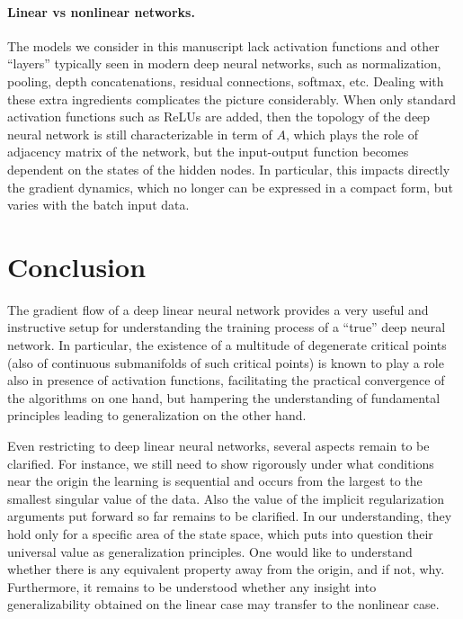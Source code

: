 \documentclass{article}
\newcommand{\1}{\mathds{1}}
\begin{document}
\paragraph{Linear vs nonlinear networks.}
The models we consider in this manuscript lack activation functions and other ``layers'' typically seen in modern deep neural networks, such as normalization, pooling, depth concatenations, residual connections, softmax, etc. 
Dealing with these extra ingredients complicates the picture considerably. 
When only standard activation functions such as ReLUs are added, then the topology of the deep neural network is still characterizable in term of $A$, which plays the role of adjacency matrix of the network, but the input-output function becomes dependent on the states of the hidden nodes. In particular, this impacts directly the gradient dynamics, which no longer can be expressed in a compact form, but varies with the batch input data.


\section{Conclusion}
\label{sec:conclusion}
The gradient flow of a deep linear neural network provides a very useful and instructive setup for understanding the training process of a ``true'' deep neural network. 
In particular, the existence of a multitude of degenerate critical points (also of continuous submanifolds of such critical points) is known to play a role also in presence of activation functions, facilitating the practical convergence of the algorithms on one hand, but hampering the understanding of fundamental principles leading to generalization on the other hand.

Even restricting to deep linear neural networks, several aspects remain to be clarified. For instance, we still need to show rigorously under what conditions near the origin the learning is sequential and occurs from the largest to the smallest singular value of the data. 
Also the value of the implicit regularization arguments put forward so far remains to be clarified. In our understanding, they hold only for a specific area of the state space, which puts into question their universal value as generalization principles.
One would like to understand whether there is any equivalent property away from the origin, and if not, why. 
Furthermore, it remains to be understood whether any insight into generalizability obtained on the linear case may transfer to the nonlinear case.
\end{document}
